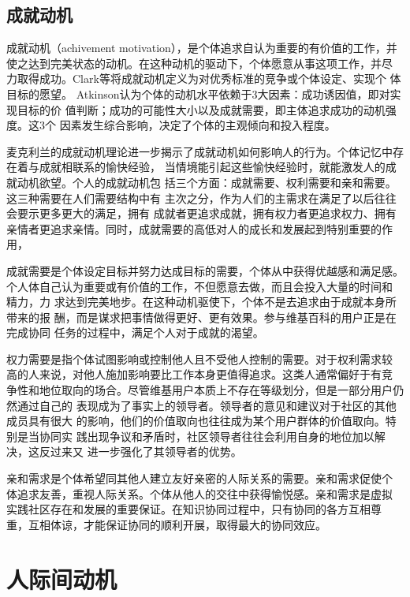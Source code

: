 \subsection{成就动机}
\label{sec:achievement}
成就动机（achivement motivation），是个体追求自认为重要的有价值的工作，并
使之达到完美状态的动机。在这种动机的驱动下，个体愿意从事这项工作，并尽
力取得成功。Clark等将成就动机定义为对优秀标准的竞争或个体设定、实现个
体目标的愿望\cite{clark1956hope}。
Atkinson认为个体的动机水平依赖于3大因素：成功诱因值，即对实现目标的价
值判断；成功的可能性大小以及成就需要，即主体追求成功的动机强度。这3个
因素发生综合影响，决定了个体的主观倾向和投入程度\cite{atkinson1953achievement}。

麦克利兰的成就动机理论进一步揭示了成就动机如何影响人的行为。个体记忆中存在着与成就相联系的愉快经验，
当情境能引起这些愉快经验时，就能激发人的成就动机欲望。个人的成就动机包
括三个方面：成就需要、权利需要和亲和需要。这三种需要在人们需要结构中有
主次之分，作为人们的主需求在满足了以后往往会要示更多更大的满足，拥有
成就者更追求成就，拥有权力者更追求权力、拥有亲情者更追求亲情。同时，成就需要的高低对人的成长和发展起到特别重要的作用，

成就需要是个体设定目标并努力达成目标的需要，个体从中获得优越感和满足感。
个人体自己认为重要或有价值的工作，不但愿意去做，而且会投入大量的时间和
精力，力
求达到完美地步。在这种动机驱使下，个体不是去追求由于成就本身所带来的报
酬，而是谋求把事情做得更好、更有效果。参与维基百科的用户正是在完成协同
任务的过程中，满足个人对于成就的渴望。

权力需要是指个体试图影响或控制他人且不受他人控制的需要。对于权利需求较
高的人来说，对他人施加影响要比工作本身更值得追求。这类人通常偏好于有竞
争性和地位取向的场合。尽管维基用户本质上不存在等级划分，但是一部分用户仍然通过自己的
表现成为了事实上的领导者。领导者的意见和建议对于社区的其他成员具有很大
的影响，他们的价值取向也往往成为某个用户群体的价值取向。特别是当协同实
践出现争议和矛盾时，社区领导者往往会利用自身的地位加以解决，这反过来又
进一步强化了其领导者的优势。

亲和需求是个体希望同其他人建立友好亲密的人际关系的需要。亲和需求促使个
体追求友善，重视人际关系。个体从他人的交往中获得愉悦感。亲和需求是虚拟
实践社区存在和发展的重要保证。在知识协同过程中，只有协同的各方互相尊
重，互相体谅，才能保证协同的顺利开展，取得最大的协同效应。

\section{人际间动机}
\label{sec:groupe-motivation}

